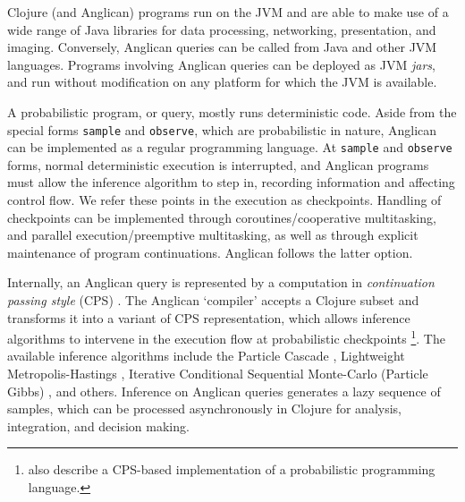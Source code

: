 \documentclass[sigconf]{acmart}
\begin{document}
Clojure (and Anglican) programs run on the JVM and are able to make
use of a wide range of Java libraries for data processing,
networking, presentation, and imaging. Conversely, Anglican queries
can be called from Java and other JVM languages. Programs involving
Anglican queries can be deployed as JVM \textit{jars}, and run without modification on any platform for which the JVM is available.

A probabilistic program, or query, mostly runs deterministic code.
Aside from the special forms \texttt{sample} and \texttt{observe},
which are probabilistic in nature, Anglican can be implemented as a
regular programming language. At \texttt{sample} and
\texttt{observe} forms, normal deterministic execution is 
interrupted, and Anglican programs must allow the inference algorithm
to step in, recording information and affecting control flow. We refer these points in the execution as checkpoints. Handling of 
checkpoints can be implemented through coroutines/cooperative multitasking, and parallel execution/preemptive multitasking, as well as through explicit maintenance of program continuations. Anglican follows the latter option. 

Internally, an Anglican query is represented by a computation in
\textit{continuation passing style} (CPS) \cite{AJ89}. The Anglican 
`compiler'\iftoggle{full}{, represented by a set of functions in the
\texttt{anglican.trap} namespace,}{} accepts a Clojure subset and 
transforms it into a variant of CPS representation, which allows 
inference algorithms to intervene in the execution flow at 
probabilistic checkpoints \footnote{\cite{GS15} also describe a
CPS-based implementation of a probabilistic programming language.}.
The available inference algorithms include the Particle Cascade
\cite{PWD+14}, Lightweight Metropolis-Hastings \cite{WSG11}, Iterative Conditional Sequential Monte-Carlo (Particle Gibbs)
\cite{WVM14}, and others. Inference on Anglican queries generates a lazy sequence of samples, which can be processed asynchronously in Clojure for analysis, integration, and decision making.

\iftoggle{full}{%
Depending on the \textit{inference algorithm}, \texttt{sample}
and \texttt{observe} may result in implicit input/output
operations and control changes. For example, \texttt{observe} in
particle filtering inference algorithms \cite{WVM14} is a non-deterministic
control statement at which a particle (corresponding to
a user-level thread executing a program)
can be either replicated or terminated. Similarly, in 
Metropolis-Hastings \cite{WSG11},
\texttt{sample} is both an input
statement which `reads' values from a random source,
and a non-deterministic control statement
(with delayed effect), eventually affecting acceptance or
rejection of a sample.
}{%
}%
\end{document}
